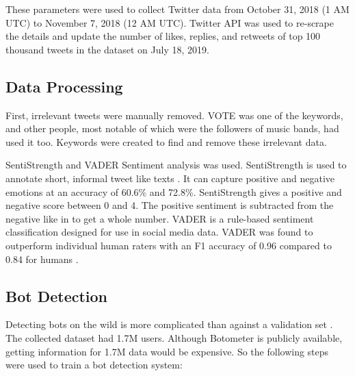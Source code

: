 \documentclass[letterpaper]{article}
\begin{document}
These parameters were used to collect Twitter data from October 31, 2018 (1 AM UTC) to November 7, 2018 (12 AM UTC). Twitter API was used to re-scrape the details and update the number of likes, replies, and retweets of top 100 thousand tweets  
in the dataset on July 18, 2019.

\subsection{Data Processing}
First, irrelevant tweets were manually removed. VOTE was one of the keywords, and other people, most notable of which were the followers of music bands, had used it too. Keywords were created to find and remove these irrelevant data.\par

SentiStrength and VADER Sentiment analysis was used. SentiStrength \cite{thelwall2010sentiment} is used to annotate short, informal tweet like texts \cite{bessi2016social}. 
It can capture positive and negative emotions at an accuracy of 60.6\% and 72.8\%. SentiStrength gives a positive and negative score between 0 and 4. The positive sentiment is subtracted 
from the negative like in \cite{bessi2016social} to get a whole number. VADER is a rule-based sentiment classification designed for use in social media data. VADER was found to outperform 
individual human raters with an F1 accuracy of 0.96 compared to 0.84 for humans \cite{hutto2014vader}.

\subsection{Bot Detection}
Detecting bots on the wild is more complicated than against a validation set \cite{bovet2019influence,varol2017early,ferrara2016rise}. The collected dataset had 1.7M 
users. Although Botometer is publicly available, getting information for 1.7M data would be expensive. So the following steps were used to train a bot detection system:
\end{document}
